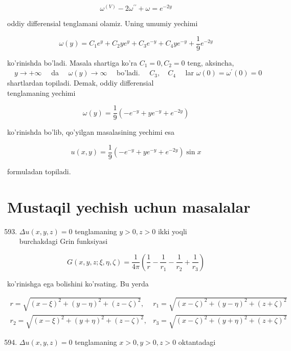 \documentclass[10pt]{article}
\begin{document}
$$
\omega^{(V)}-2 \omega^{\prime \prime}+\omega=e^{-2 y}
$$

oddiy differensial tenglamani olamiz. Uning umumiy yechimi

$$
\omega(y)=C_{1} e^{y}+C_{2} y e^{y}+C_{3} e^{-y}+C_{4} y e^{-y}+\frac{1}{9} e^{-2 y}
$$

ko'rinishda bo'ladi. Masala shartiga ko'ra $C_{1}=0, C_{2}=0$ teng, aksincha, $\quad y \rightarrow+\infty \quad$ da $\quad \omega(y) \rightarrow \infty \quad$ bo'ladi. $\quad C_{3}, \quad C_{4} \quad$ lar $\omega(0)=\omega^{\prime}(0)=0$ shartlardan topiladi. Demak, oddiy differensial\\
tenglamaning yechimi

$$
\omega(y)=\frac{1}{9}\left(-e^{-y}+y e^{-y}+e^{-2 y}\right)
$$

ko'rinishda bo'lib, qo'yilgan masalasining yechimi esa

$$
u(x, y)=\frac{1}{9}\left(-e^{-y}+y e^{-y}+e^{-2 y}\right) \sin x
$$

formuladan topiladi.

\section*{Mustaqil yechish uchun masalalar}
\begin{enumerate}
  \setcounter{enumi}{592}
  \item $\Delta u(x, y, z)=0$ tenglamaning $y>0, z>0$ ikki yoqli\\
burchakdagi Grin funksiyasi
\end{enumerate}

$$
G(x, y, z ; \xi, \eta, \zeta)=\frac{1}{4 \pi}\left(\frac{1}{r}-\frac{1}{r_{1}}-\frac{1}{r_{2}}+\frac{1}{r_{3}}\right)
$$

ko'rinishga ega bolishini ko'rsating. Bu yerda

$$
\begin{array}{ll}
r=\sqrt{(x-\xi)^{2}+(y-\eta)^{2}+(z-\zeta)^{2}}, & r_{1}=\sqrt{(x-\zeta)^{2}+(y-\eta)^{2}+(z+\zeta)^{2}} \\
r_{2}=\sqrt{(x-\xi)^{2}+(y+\eta)^{2}+(z-\zeta)^{2}}, & r_{3}=\sqrt{(x-\zeta)^{2}+(y+\eta)^{2}+(z+\zeta)^{2}}
\end{array}
$$

\begin{enumerate}
  \setcounter{enumi}{593}
  \item $\Delta u(x, y, z)=0$ tenglamaning $x>0, y>0, z>0$ oktantadagi
\end{enumerate}
\end{document}
